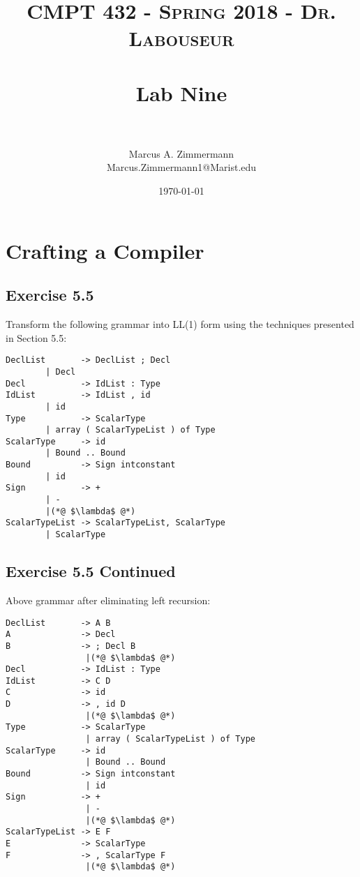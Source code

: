 \documentclass[letterpaper, 10pt,DIV=13]{scrartcl}
\title{	
   \normalfont \normalsize
   \textsc{CMPT 432 - Spring 2018 - Dr. Labouseur} \\[10pt] %
   \horrule{0.5pt} \\[0.25cm] 	%
   \huge Lab Nine  \\     	    %
   \horrule{0.5pt} \\[0.25cm] 	%
}
\author{Marcus A. Zimmermann \\ \normalsize Marcus.Zimmermann1@Marist.edu}
\date{\normalsize\today} 	%
\numberwithin{equation}{section} %
\numberwithin{figure}{section} %
\numberwithin{table}{section} %
\begin{document}
\maketitle %

\section*{Crafting a Compiler}
\subsection*{Exercise 5.5}
Transform the following grammar into LL(1) form using the techniques presented in Section 5.5:
\begin{lstlisting}
DeclList       -> DeclList ; Decl
		| Decl
Decl	       -> IdList : Type
IdList	       -> IdList , id
		| id
Type	       -> ScalarType
		| array ( ScalarTypeList ) of Type
ScalarType     -> id
		| Bound .. Bound
Bound 	       -> Sign intconstant
		| id
Sign 	       -> +
		| -
		|(*@ $\lambda$ @*)
ScalarTypeList -> ScalarTypeList, ScalarType
		| ScalarType
\end{lstlisting}

\pagebreak

\subsection*{Exercise 5.5 Continued}
Above grammar after eliminating left recursion:
\begin{lstlisting}
DeclList       -> A B
A              -> Decl
B              -> ; Decl B
                |(*@ $\lambda$ @*)
Decl           -> IdList : Type
IdList         -> C D
C              -> id
D              -> , id D
                |(*@ $\lambda$ @*)
Type           -> ScalarType
                | array ( ScalarTypeList ) of Type
ScalarType     -> id
                | Bound .. Bound
Bound          -> Sign intconstant
                | id
Sign           -> +
                | -
                |(*@ $\lambda$ @*)
ScalarTypeList -> E F
E              -> ScalarType
F              -> , ScalarType F
                |(*@ $\lambda$ @*)
\end{lstlisting}

%
% 
\end{document}
